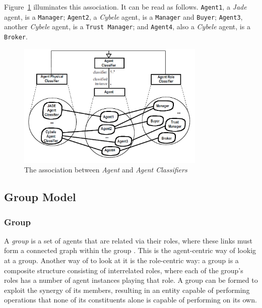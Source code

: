 Figure~\ref{figure:onp-agent-agent-classifier-association} illuminates this association.
It can be read as follows. \texttt{Agent1}, a \textit{Jade} agent, is a \texttt{Manager}; \texttt{Agent2}, a \textit{Cybele} agent, is a \texttt{Manager} and \texttt{Buyer}; \texttt{Agent3}, another \textit{Cybele} agent, is a \texttt{Trust Manager}; and \texttt{Agent4}, also a \textit{Cybele} agent, is a \texttt{Broker}.

\begin{figure}[ht]
	\centering
	\includegraphics[width=0.8\textwidth]{images/onp/agent-agent-classifier-association.png}
	\caption{The association between \textit{Agent} and \textit{Agent Classifiers} \cite{Odell05}}
	\label{figure:onp-agent-agent-classifier-association}
\end{figure}

\subsection{Group Model}

\subsubsection*{Group}

A \textit{group} is a set of agents that are related via their roles, where these links must form
a connected graph within the group \cite{Odell05}.
This is the agent-centric way of lookig at a group.
Another way of to look at it is the role-centric way: a group is a composite structure consisting of interrelated roles, where each of the group's roles has a number of agent instances \cite{Odell05} playing that role.
A group can be formed to exploit the synergy of its members, resulting in an entity capable of performing operations that none of its constituents alone is capable of performing on its own.

